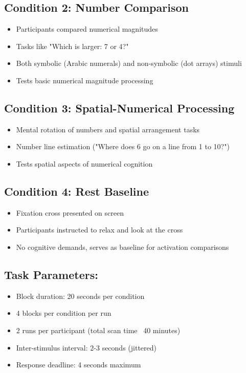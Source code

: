 \documentclass[12pt, a4paper]{article}
\begin{document}
\subsection*{Condition 2: Number Comparison}
\begin{itemize}
\item Participants compared numerical magnitudes
\item Tasks like "Which is larger: 7 or 4?"
\item Both symbolic (Arabic numerals) and non-symbolic (dot arrays) stimuli
\item Tests basic numerical magnitude processing
\end{itemize}


\subsection*{Condition 3: Spatial-Numerical Processing}
\begin{itemize}
\item Mental rotation of numbers and spatial arrangement tasks
\item Number line estimation ("Where does 6 go on a line from 1 to 10?")
\item Tests spatial aspects of numerical cognition
\end{itemize}

\subsection*{Condition 4: Rest Baseline}
\begin{itemize}
\item Fixation cross presented on screen
\item Participants instructed to relax and look at the cross
\item No cognitive demands, serves as baseline for activation comparisons
\end{itemize}


\subsection*{Task Parameters:}
\begin{itemize}
\item Block duration: 20 seconds per condition
\item 4 blocks per condition per run
\item 2 runs per participant (total scan time ~40 minutes)
\item Inter-stimulus interval: 2-3 seconds (jittered)
\item Response deadline: 4 seconds maximum
\end{itemize}
\end{document}
